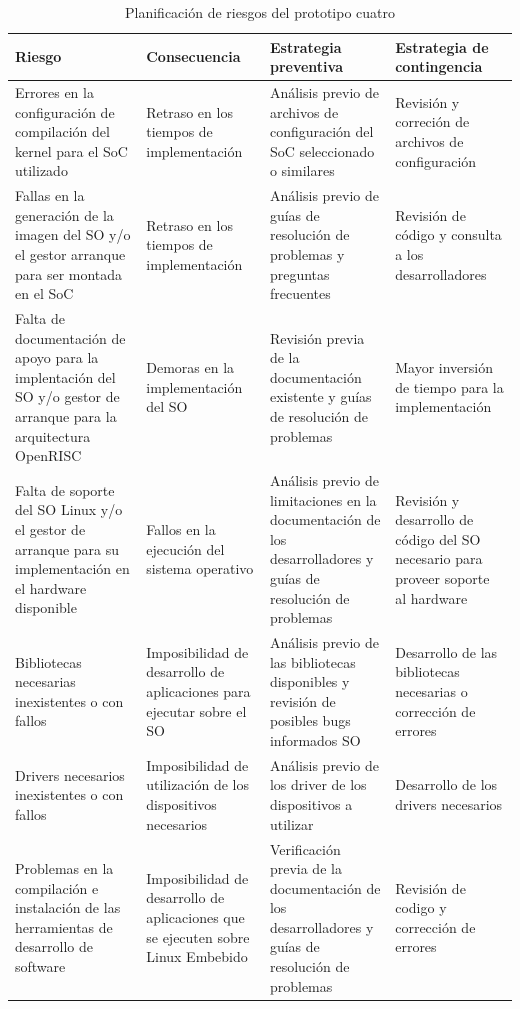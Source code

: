  		\begin{table}[h!]
		\centering
		\begin{tabular}{ p{4cm} p{4cm} p{4cm} p{3cm} }
		\hline 
		\rowcolor[gray]{0.8} Riesgo & Consecuencia & Estrategia preventiva & Estrategia de contingencia\\
		\hline Errores en la configuración de compilación del kernel para el SoC utilizado & 
		       Retraso en los tiempos de implementación & 
		       Análisis previo de archivos de configuración del SoC seleccionado o similares & 
		       Revisión y correción de archivos de configuración\\
		\hline Fallas en la generación de la imagen del SO y/o el gestor arranque para ser montada en el SoC & 
		       Retraso en los tiempos de implementación & 
		       Análisis previo de guías de resolución de problemas y preguntas frecuentes & 
		       Revisión de código y consulta a los desarrolladores\\
		\hline Falta de documentación de apoyo para la implentación del SO y/o gestor de arranque para la arquitectura OpenRISC & 
		       Demoras en la implementación del SO & 
		       Revisión previa de la documentación existente y guías de resolución de problemas & 
		       Mayor inversión de tiempo para la implementación\\
		\hline Falta de soporte del SO Linux y/o el gestor de arranque para su implementación en el hardware disponible & 
			   Fallos en la ejecución del sistema operativo & 
		       Análisis previo de limitaciones en la documentación de los desarrolladores y guías de resolución de problemas & 
		       Revisión y desarrollo de código del SO necesario para proveer soporte al hardware\\
		\hline Bibliotecas necesarias inexistentes o con fallos & 
			   Imposibilidad de desarrollo de aplicaciones para ejecutar sobre el SO &
			   Análisis previo de las bibliotecas disponibles y revisión de posibles bugs informados SO & 
			   Desarrollo de las bibliotecas necesarias o corrección de errores\\
		\hline Drivers necesarios inexistentes o con fallos & 
			   Imposibilidad de utilización de los dispositivos necesarios & 
			   Análisis previo de los driver de los dispositivos a utilizar & 
			   Desarrollo de los drivers necesarios\\		
		\hline Problemas en la compilación e instalación de las herramientas de desarrollo de software & 
			   Imposibilidad de desarrollo de aplicaciones que se ejecuten sobre Linux Embebido & 
			   Verificación previa de la documentación de los desarrolladores y guías de resolución de problemas & 
			   Revisión de codigo y corrección de errores\\
		\hline
		\end{tabular}
		\caption{Planificación de riesgos del prototipo cuatro}
		\label{tab:planificación4}
		\end{table}


